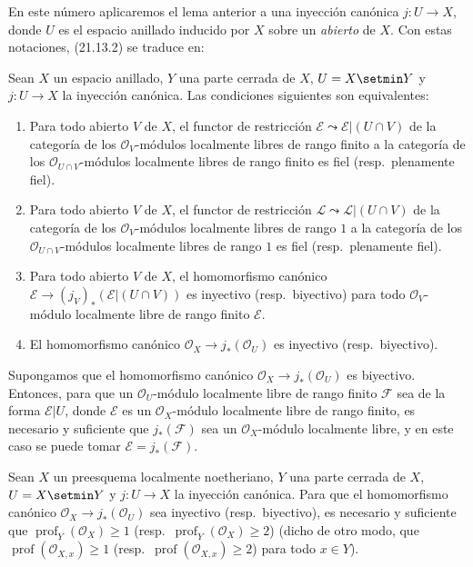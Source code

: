 En este número aplicaremos el lema anterior a una inyección canónica
$j:U\to X$, donde $U$ es el espacio anillado inducido por $X$ sobre un \emph{abierto} de $X$.
Con estas notaciones, (21.13.2) se traduce en:

\begin{corollary}[21.13.3]
\label{IV.21.13.3}
Sean $X$ un espacio anillado, $Y$ una parte cerrada de $X$, $U=X\setmin Y$ y
$j:U\to X$ la inyección canónica. Las condiciones siguientes son equivalentes:
\begin{enumerate}[label=\emph{\alph*)}]
  \item Para todo abierto $V$ de $X$, el functor de restricción
  $\mathscr E\leadsto\mathscr E|(U\cap V)$ de la categoría de los
  $\mathcal O_V$-módulos localmente libres de rango finito a la categoría de los
  $\mathcal O_{U\cap V}$-módulos localmente libres de rango finito es fiel
  \textup{(resp.}\ plenamente fiel\textup{)}.
  \item[\emph{a')}] Para todo abierto $V$ de $X$, el functor de restricción
  $\mathscr L\leadsto\mathscr L|(U\cap V)$ de la categoría de los
  $\mathcal O_V$-módulos localmente libres de rango $1$ a la categoría de los
  $\mathcal O_{U\cap V}$-módulos localmente libres de rango $1$ es fiel
  \textup{(resp.}\ plenamente fiel\textup{)}.
  \item Para todo abierto $V$ de $X$, el homomorfismo canónico
  $\mathscr E\to(j_V)_*(\mathscr E|(U\cap V))$ es inyectivo \textup{(resp.}\ biyectivo\textup{)} para
  todo $\mathcal O_V$-módulo localmente libre de rango finito $\mathscr E$.
  \item[\emph{b')}] El homomorfismo canónico
  $\mathcal O_X\to j_*(\mathcal O_U)$ es inyectivo \textup{(resp.}\ biyectivo\textup{)}.
\end{enumerate}

Supongamos que el homomorfismo canónico $\mathcal O_X\to j_*(\mathcal O_U)$ es
biyectivo. Entonces, para que un $\mathcal O_U$-módulo localmente libre de rango finito
$\mathscr F$ sea de la forma $\mathscr E|U$, donde $\mathscr E$ es un
$\mathcal O_X$-módulo localmente libre de rango finito, es necesario y suficiente que
$j_*(\mathscr F)$ sea un $\mathcal O_X$-módulo localmente libre, y en este caso se
puede tomar $\mathscr E=j_*(\mathscr F)$.
\end{corollary}

\begin{lemma}[21.13.4]
\label{IV.21.13.4}
Sean $X$ un preesquema localmente noetheriano, $Y$ una parte cerrada de $X$,
$U=X\setmin Y$ y $j:U\to X$ la inyección canónica. Para que el homomorfismo canónico
$\mathcal O_X\to j_*(\mathcal O_U)$ sea inyectivo \textup{(resp.}\ biyectivo\textup{)}, es necesario y
suficiente que $\operatorname{prof}_Y(\mathcal O_X)\geq1$
\textup{(resp.\ $\operatorname{prof}_Y(\mathcal O_X)\geq2$) (dicho de otro modo, que
$\operatorname{prof}(\mathcal O_{X,x})\geq1$
(resp.\ $\operatorname{prof}(\mathcal O_{X,x})\geq2$) para todo $x\in Y$)}.
\end{lemma}

